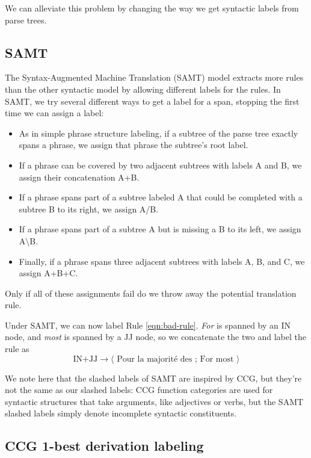 \documentclass[a4paper]{article}
\begin{document}
We can alleviate this problem by changing the way we get syntactic labels from parse trees.

\subsection{SAMT}

The Syntax-Augmented Machine Translation (SAMT) model \cite{samt-wmt06} extracts more rules than the other syntactic model by allowing different labels for the rules. In SAMT, we try several different ways to get a label for a span, stopping the first time we can assign a label:
\begin{itemize}
\item As in simple phrase structure labeling, if a subtree of the parse tree exactly spans a phrase, we assign that phrase the subtree's root label.
\item If a phrase can be covered by two adjacent subtrees with labels A and B, we assign their concatenation A+B.
\item If a phrase spans part of a subtree labeled A that could be completed with a subtree B to its right, we assign A/B.
\item If a phrase spans part of a subtree A but is missing a B to its left, we assign A\textbackslash B.
\item Finally, if a phrase spans three adjacent subtrees with labels A, B, and C, we assign A+B+C.
\end{itemize}
Only if all of these assignments fail do we throw away the potential translation rule.

Under SAMT, we can now label Rule \ref{eqn:bad-rule}. {\em For} is spanned by an IN node, and {\em most} is spanned by a JJ node, so we concatenate the two and label the rule as
\begin{equation*}
\textrm{IN+JJ} \to \langle \textrm{ Pour la majorit\'{e} des ; For most } \rangle
\end{equation*}

We note here that the slashed labels of SAMT are inspired by CCG, but they're not the same as our slashed labels: CCG function categories are used for syntactic structures that take arguments, like adjectives or verbs, but the SAMT slashed labels simply denote incomplete syntactic constituents.

\subsection{CCG 1-best derivation labeling}
\label{sec:ccg-1-best}
\end{document}
